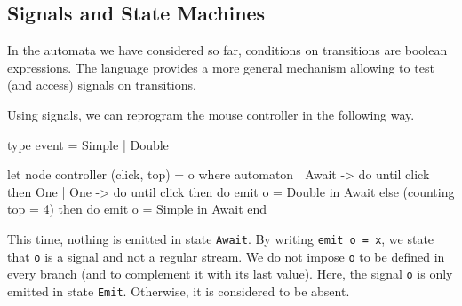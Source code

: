 \documentclass[11pt,titlepage,twoside]{report}
\begin{document}



\subsection{Signals and State Machines\label{statemachinesig}} %
In the automata we have considered so far, conditions on transitions
are boolean expressions. The language provides a more general
mechanism allowing to test (and access) signals on transitions.

Using signals, we can reprogram the mouse controller in the following
way.
\begin{chklisting}[include=counting,withresult]
type event = Simple | Double

let node controller (click, top) = o where
  automaton
  | Await ->
     do until click then One
  | One ->
     do until click then do emit o = Double in Await
        else (counting top = 4) then do emit o = Simple in Await
  end
\end{chklisting}

This time, nothing is emitted in state \verb-Await-. By
writing \verb-emit o = x-, we state that \verb-o- is a signal and not
a regular stream. We do not impose \verb-o- to be defined in every
branch (and to complement it with its last value). Here, the signal
\verb-o- is only emitted in state \verb-Emit-. Otherwise, it is
considered to be absent.
\end{document}
